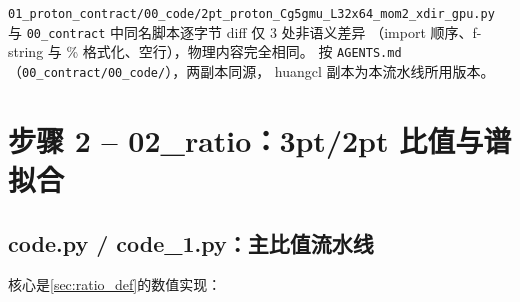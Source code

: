 \documentclass[UTF8,11pt]{ctexart}
\begin{document}
\texttt{01\_proton\_contract/00\_code/2pt\_proton\_Cg5gmu\_L32x64\_mom2\_xdir\_gpu.py}
与 \texttt{00\_contract} 中同名脚本逐字节 diff 仅 3 处非语义差异
（import 顺序、f-string 与 \% 格式化、空行），物理内容完全相同。
按 \texttt{AGENTS.md}（\texttt{00\_contract/00\_code/}），两副本同源，
huangcl 副本为本流水线所用版本。

\section{步骤 2 -- 02\_ratio：3pt/2pt 比值与谱拟合}
\label{sec:step2}

\subsection{code.py / code\_1.py：主比值流水线}
\label{sec:code_main}

核心是\ref{sec:ratio_def}的数值实现：
\end{document}
